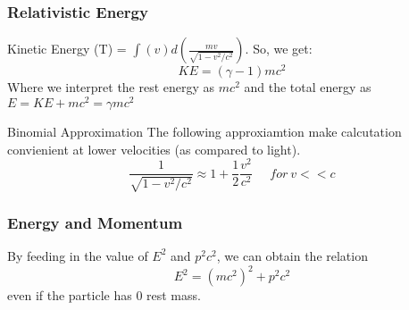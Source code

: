 \subsubsection{Relativistic Energy}

Kinetic Energy (T) = $ \int (v) d(\frac{mv}{\sqrt{1 - v^2/c^2}}) $.
So, we get:
\begin{equation}
    KE = (\gamma - 1) mc^2
\end{equation}
Where we interpret the rest energy as $mc^2$ and the total energy as $E = KE + mc^2 = \gamma mc^2$

\begin{note}{Binomial Approximation}
    The following approxiamtion make calcutation convienient at lower velocities (as compared to light).
    \begin{equation}
        \frac{1}{\sqrt{1 - v^2/c^2}} \approx 1 + \frac{1}{2} \frac{v^2}{c^2} \;\;\;\;\; for \: v << c
    \end{equation}
\end{note}

\subsubsection{Energy and Momentum}
By feeding in the value of $E^2$ and $p^2 c^2$, we can obtain the relation
\begin{equation}
    E^2 = (mc^2)^2 + p^2 c^2
\end{equation}
even if the particle has 0 rest mass.